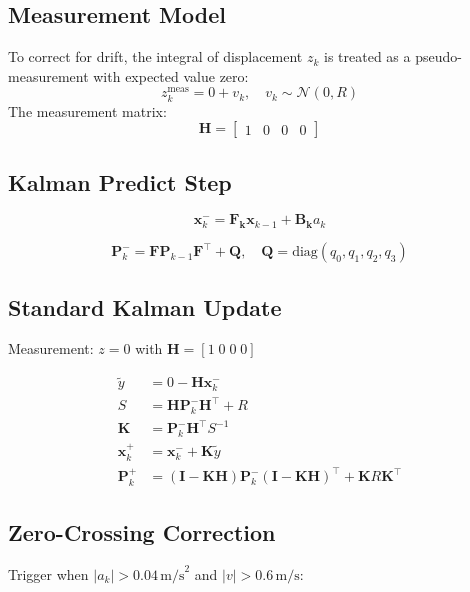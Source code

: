 \documentclass[11pt,letterpaper]{article}
\begin{document}
\subsection{Measurement Model}
To correct for drift, the integral of displacement \( z_k \) is treated as a pseudo-measurement with expected value zero:
\[
z_k^\text{meas} = 0 + v_k, \quad v_k \sim \mathcal{N}(0, R)
\]
The measurement matrix:
\begin{equation}
\mathbf{H} = \begin{bmatrix} 1 & 0 & 0 & 0 \end{bmatrix}
\end{equation}



\subsection{Kalman Predict Step}
\begin{equation}
\bm{x}_k^- = \bm{F_{k}}\bm{x}_{k-1} + \bm{B_{k}}a_k
\end{equation}

\begin{equation}
\bm{P}_k^- = \bm{F}\bm{P}_{k-1}\bm{F}^\top + \bm{Q}, \quad 
\bm{Q} = \mathrm{diag}(q_0, q_1, q_2, q_3)
\end{equation}

\subsection{Standard Kalman Update}
Measurement: $z=0$ with $\bm{H} = [1\;0\;0\;0]$

\begin{align}
\tilde{y} &= 0 - \bm{H}\bm{x}_k^- \\
S &= \bm{H}\bm{P}_k^-\bm{H}^\top + R \\
\bm{K} &= \bm{P}_k^- \bm{H}^\top S^{-1} \\
\bm{x}_k^+ &= \bm{x}_k^- + \bm{K}\tilde{y} \\
\bm{P}_k^+ &= (\bm{I}-\bm{K}\bm{H})\bm{P}_k^-(\bm{I}-\bm{K}\bm{H})^\top + \bm{K}R\bm{K}^\top
\end{align}

\subsection{Zero-Crossing Correction}
Trigger when $|a_k| > 0.04\,\text{m/s}^2$ and $|v| > 0.6\,\text{m/s}$:
\end{document}
